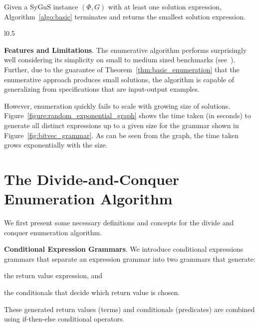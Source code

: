 \documentclass{llncs}
\newcommand\Spec{\Phi}
\newcommand\Grammar{G}
\renewcommand{\paragraph}[1]{\par\noindent\textbf{#1}.}
\begin{document}
\begin{theorem}
  \label{thm:basic_enumeration}
  Given a SyGuS instance $(\Spec, \Grammar)$ with at least one solution
  expression, Algorithm~\ref{algo:basic} terminates and returns the
  smallest solution expression.
\end{theorem}

\begin{wrapfigure}{l}{0.5\textwidth}
\centering
{}
\caption{Scalability of Enumeration}
\label{figure:random_exponential_graph}
\end{wrapfigure}
\paragraph{Features and Limitations}
The enumerative algorithm performs surprisingly well considering its
simplicity on small to medium sized benchmarks
(see~\cite{udupa-transit,udupa-sygus}).
Further, due to the guarantee of Theorem~\ref{thm:basic_enumeration}
that the enumerative approach produces small solutions, the algorithm is
capable of generalizing from specifications that are input-output
examples.

However, enumeration quickly fails to scale with growing size of
solutions.
Figure~\ref{figure:random_exponential_graph} shows the time taken (in seconds) to
generate all distinct expressions up to a given size for the grammar
shown in Figure~\ref{fig:bitvec_grammar}.
As can be seen from the graph, the time taken grows exponentially with
the size.



\section{The Divide-and-Conquer Enumeration Algorithm}
\label{sec:algo}

We first present some necessary definitions and concepts for the divide
and conquer enumeration algorithm.

\paragraph{Conditional Expression Grammars}
We introduce conditional expressions grammars that separate an
expression grammar into two grammars that generate:
\begin{inparaenum}[(a)]
\item the return value expression, and
\item the conditionals that decide which return value is chosen.
\end{inparaenum}
These generated return values (terms) and conditionals (predicates) are
combined using if-then-else conditional operators.
\end{document}
